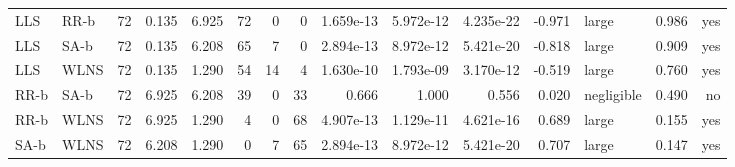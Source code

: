 \begin{table}[htbp]
\begin{tabular}{llrrrrrrrrrrlrr}
LLS & RR-b & 72 & 0.135 & 6.925 & 72 & 0 & 0 & 1.659e-13 & 5.972e-12 & 4.235e-22 & -0.971 & large & 0.986 & yes \\
LLS & SA-b & 72 & 0.135 & 6.208 & 65 & 7 & 0 & 2.894e-13 & 8.972e-12 & 5.421e-20 & -0.818 & large & 0.909 & yes \\
LLS & WLNS & 72 & 0.135 & 1.290 & 54 & 14 & 4 & 1.630e-10 & 1.793e-09 & 3.170e-12 & -0.519 & large & 0.760 & yes \\
RR-b & SA-b & 72 & 6.925 & 6.208 & 39 & 0 & 33 & 0.666 & 1.000 & 0.556 & 0.020 & negligible & 0.490 & no \\
RR-b & WLNS & 72 & 6.925 & 1.290 & 4 & 0 & 68 & 4.907e-13 & 1.129e-11 & 4.621e-16 & 0.689 & large & 0.155 & yes \\
SA-b & WLNS & 72 & 6.208 & 1.290 & 0 & 7 & 65 & 2.894e-13 & 8.972e-12 & 5.421e-20 & 0.707 & large & 0.147 & yes \\
\bottomrule
\end{tabular}
\end{table}
